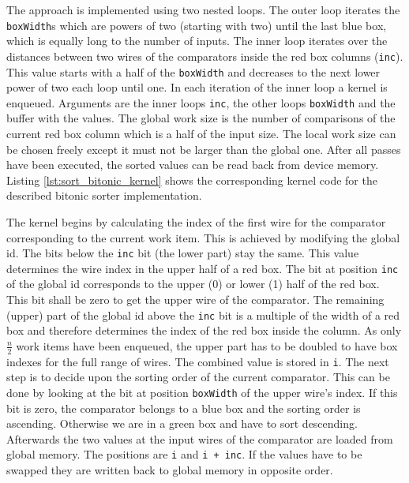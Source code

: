 The approach is implemented using two nested loops. The outer loop iterates the \lstinline!boxWidth!s which are powers of two (starting with two) until the last blue box, which is equally long to the number of inputs. The inner loop iterates over the distances between two wires of the comparators inside the red box columns (\lstinline!inc!). This value starts with a half of the \lstinline!boxWidth! and decreases to the next lower power of two each loop until one.
In each iteration of the inner loop a kernel is enqueued. Arguments are the inner loops \lstinline!inc!, the other loops \lstinline!boxWidth! and the buffer with the values. The global work size is the number of comparisons of the current red box column which is a half of the input size. The local work size can be chosen freely except it must not be larger than the global one.
After all passes have been executed, the sorted values can be read back from device memory.
Listing \ref{lst:sort_bitonic_kernel} shows the corresponding kernel code for the described bitonic sorter implementation.



The kernel begins by calculating the index of the first wire for the comparator corresponding to the current work item. This is achieved by modifying the global id. The bits below the \lstinline!inc! bit (the lower part) stay the same. This value determines the wire index in the upper half of a red box. The bit at position \lstinline!inc! of the global id corresponds to the upper (0) or lower (1) half of the red box. This bit shall be zero to get the upper wire of the comparator. The remaining (upper) part of the global id above the \lstinline!inc! bit is a multiple of the width of a red box and therefore determines the index of the red box inside the column. As only $\frac{n}{2}$ work items have been enqueued, the upper part has to be doubled to have box indexes for the full range of wires. The combined value is stored in \lstinline!i!.
The next step is to decide upon the sorting order of the current comparator. This can be done by looking at the bit at position \lstinline!boxWidth! of the upper wire's index. If this bit is zero, the comparator belongs to a blue box and the sorting order is ascending. Otherwise we are in a green box and have to sort descending.
Afterwards the two values at the input wires of the comparator are loaded from global memory. The positions are \lstinline!i! and \lstinline!i + inc!. If the values have to be swapped they are written back to global memory in opposite order.

